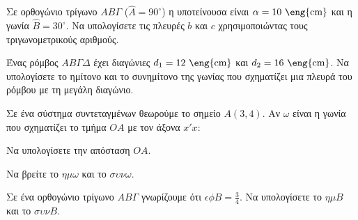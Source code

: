\documentclass[11pt,a4paper,modern]{FFExercises}
\begin{document}
\askhsh
Σε ορθογώνιο τρίγωνο $AB\varGamma$ ($\hat{A}=90^\circ$) η υποτείνουσα είναι $\alpha=10\text{ \eng{cm}}$ και η γωνία $\hat{B}=30^\circ$. Να υπολογίσετε τις πλευρές $b$ και $c$ χρησιμοποιώντας τους τριγωνομετρικούς αριθμούς.

\askhsh
Ένας ρόμβος $AB\varGamma\varDelta$ έχει διαγώνιες $d_1 = 12\text{ \eng{cm}}$ και $d_2 = 16\text{ \eng{cm}}$. Να υπολογίσετε το ημίτονο και το συνημίτονο της γωνίας που σχηματίζει μια πλευρά του ρόμβου με τη μεγάλη διαγώνιο.
\begin{center}
\end{center}

\askhsh
Σε ένα σύστημα συντεταγμένων θεωρούμε το σημείο $A(3,4)$. Αν $\omega$ είναι η γωνία που σχηματίζει το τμήμα $OA$ με τον άξονα $x'x$:
\begin{alist}
    \item Να υπολογίσετε την απόσταση $OA$.
    \item Να βρείτε το $\eta\mu \omega$ και το $\sigma\upsilon\nu \omega$.
\end{alist}
\begin{center}
\end{center}

\askhsh
Σε ένα ορθογώνιο τρίγωνο $AB\varGamma$ γνωρίζουμε ότι $\epsilon\phi B = \frac{3}{4}$. Να υπολογίσετε το $\eta\mu B$ και το $\sigma\upsilon\nu B$.
\end{document}

